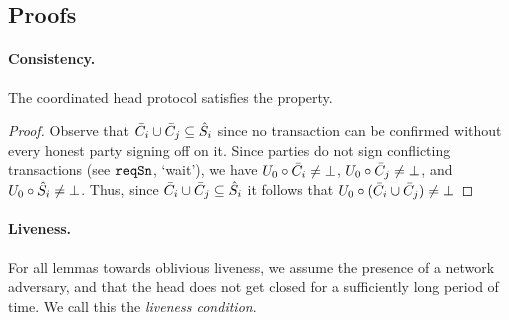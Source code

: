 \subsection{Proofs}

\paragraph{Consistency.}

\begin{lemma}[Consistency]
  \label{lem:consistency}
  The coordinated head protocol satisfies the  property.
\end{lemma}
\begin{proof}
  Observe that $\bar{C}_i\cup\bar{C}_j\subseteq\hat{S}_i$ since no
  transaction can be confirmed without every honest party signing off
  on it.  Since parties do not sign conflicting transactions
  (see $\mathtt{reqSn}$, `wait'), we have
  $U_{0}\circ\bar{C}_i\neq\bot$,
  $U_{0}\circ\bar{C}_j\neq\bot$, and
  $U_{0}\circ\hat{S}_i\neq\bot$.  Thus, since $\bar{C}_i\cup\bar{C}_j\subseteq\hat{S}_i$
  it follows that
  $U_{0}\circ(\bar{C}_i\cup\bar{C}_j)\neq\bot$
\end{proof}

\paragraph{Liveness.}
For all lemmas towards oblivious liveness, we assume the presence of a network adversary, and that the head does not get closed for a sufficiently
long period of time.
We call this the \emph{liveness condition}.

